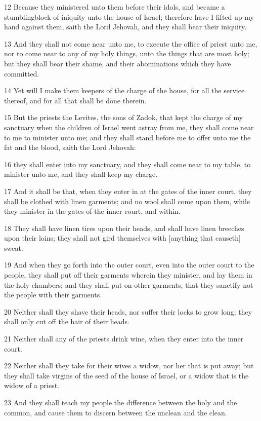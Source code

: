 \par 12 Because they ministered unto them before their idols, and became a stumblingblock of iniquity unto the house of Israel; therefore have I lifted up my hand against them, saith the Lord Jehovah, and they shall bear their iniquity.
\par 13 And they shall not come near unto me, to execute the office of priest unto me, nor to come near to any of my holy things, unto the things that are most holy; but they shall bear their shame, and their abominations which they have committed.
\par 14 Yet will I make them keepers of the charge of the house, for all the service thereof, and for all that shall be done therein.
\par 15 But the priests the Levites, the sons of Zadok, that kept the charge of my sanctuary when the children of Israel went astray from me, they shall come near to me to minister unto me; and they shall stand before me to offer unto me the fat and the blood, saith the Lord Jehovah:
\par 16 they shall enter into my sanctuary, and they shall come near to my table, to minister unto me, and they shall keep my charge.
\par 17 And it shall be that, when they enter in at the gates of the inner court, they shall be clothed with linen garments; and no wool shall come upon them, while they minister in the gates of the inner court, and within.
\par 18 They shall have linen tires upon their heads, and shall have linen breeches upon their loins; they shall not gird themselves with [anything that causeth] sweat.
\par 19 And when they go forth into the outer court, even into the outer court to the people, they shall put off their garments wherein they minister, and lay them in the holy chambers; and they shall put on other garments, that they sanctify not the people with their garments.
\par 20 Neither shall they shave their heads, nor suffer their locks to grow long; they shall only cut off the hair of their heads.
\par 21 Neither shall any of the priests drink wine, when they enter into the inner court.
\par 22 Neither shall they take for their wives a widow, nor her that is put away; but they shall take virgins of the seed of the house of Israel, or a widow that is the widow of a priest.
\par 23 And they shall teach my people the difference between the holy and the common, and cause them to discern between the unclean and the clean.
